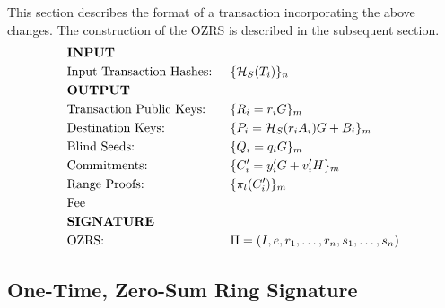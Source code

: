\documentclass{article}
\newcommand{\sidx}{\ensuremath{*}}
\newcommand{\sx}{\ensuremath{x_\sidx}}
\newcommand{\oiy}{\ensuremath{y^\prime_i}}
\newcommand{\oiC}{\ensuremath{C^\prime_i}}
\newcommand{\oiv}{\ensuremath{v^\prime_i}}
\newcommand{\hs}{\ensuremath{\mathcal{H}_S}}
\newcommand{\hp}{\ensuremath{\mathcal{H}_P}}
\begin{document}
This section describes the format of a transaction incorporating the above
changes.  The construction of the OZRS is described in the subsequent section.
\begin{align*} 
  & \text{\bf{INPUT}}       &&                                           \\%
  & \text{Input Transaction Hashes: } && \{ \hs(T_i) \}_n                 \\%
  & \text{\bf{OUTPUT}}     &&                                            \\%
  & \text{Transaction Public Keys: } && \{ R_i = r_i G \}_m               \\%
  & \text{Destination Keys: } && \{ P_i = \hs(r_i A_i)G + B_i \}_m        \\%
  & \text{Blind Seeds: } && \{ Q_i = q_i G \}_m                           \\%
  & \text{Commitments: } && \{ \oiC = \oiy G + \oiv H \}_m                \\%
  & \text{Range Proofs: } && \{ \pi_l(\oiC) \}_m                          \\%
  & \text{Fee } &&                                                       \\%
  & \text{\bf{SIGNATURE}} &&                                              \\%
  & \text{OZRS: } && \Pi = (I, e, r_1, \dots, r_n, s_1, \dots, s_n)       \\%
\end{align*} 

\subsection{One-Time, Zero-Sum Ring Signature}
\end{document}
